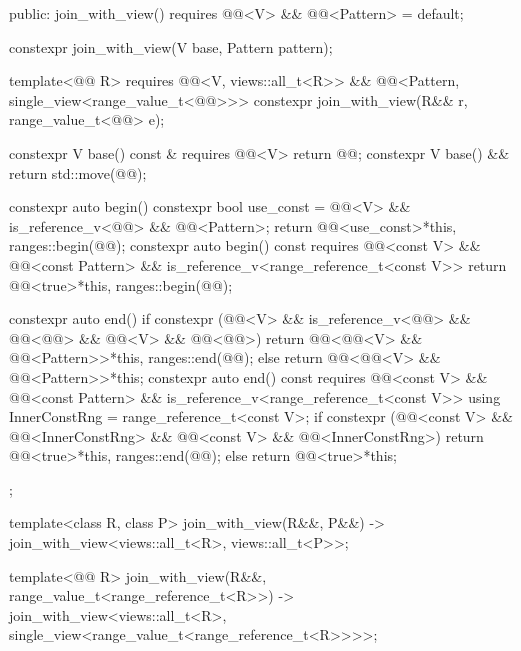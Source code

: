 \begin{codeblock}
{{  public:
    join_with_view()
      requires @@<V> && @@<Pattern> = default;

    constexpr join_with_view(V base, Pattern pattern);

    template<@@ R>
      requires @@<V, views::all_t<R>> &&
               @@<Pattern, single_view<range_value_t<@@>>>
    constexpr join_with_view(R&& r, range_value_t<@@> e);

    constexpr V base() const & requires @@<V> { return @@; }
    constexpr V base() && { return std::move(@@); }

    constexpr auto begin() {
      constexpr bool use_const =
        @@<V> && is_reference_v<@@> && @@<Pattern>;
      return @@<use_const>{*this, ranges::begin(@@)};
    }
    constexpr auto begin() const
      requires @@<const V> &&
               @@<const Pattern> &&
               is_reference_v<range_reference_t<const V>> {
      return @@<true>{*this, ranges::begin(@@)};
    }

    constexpr auto end() {
      if constexpr (@@<V> &&
                    is_reference_v<@@> && @@<@@> &&
                    @@<V> && @@<@@>)
        return @@<@@<V> && @@<Pattern>>{*this, ranges::end(@@)};
      else
        return @@<@@<V> && @@<Pattern>>{*this};
    }
    constexpr auto end() const
      requires @@<const V> && @@<const Pattern> &&
               is_reference_v<range_reference_t<const V>> {
      using InnerConstRng = range_reference_t<const V>;
      if constexpr (@@<const V> && @@<InnerConstRng> &&
                    @@<const V> && @@<InnerConstRng>)
        return @@<true>{*this, ranges::end(@@)};
      else
        return @@<true>{*this};
    }
  };

  template<class R, class P>
    join_with_view(R&&, P&&) -> join_with_view<views::all_t<R>, views::all_t<P>>;

  template<@@ R>
    join_with_view(R&&, range_value_t<range_reference_t<R>>)
      -> join_with_view<views::all_t<R>, single_view<range_value_t<range_reference_t<R>>>>;
}
\end{codeblock}

